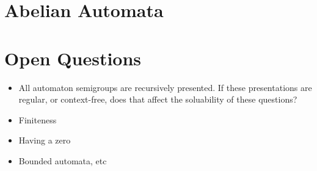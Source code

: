 \documentclass[10pt]{article} %
\newtheorem{proposition}{Proposition}
\begin{document}



    

    \section{Abelian Automata}

    \section{Open Questions} 

    \begin{itemize}
    \item All automaton semigroups are recursively presented. If these presentations are regular, or context-free, does that affect the soluability of these questions?
    \item Finiteness
    \item Having a zero
    \item Bounded automata, etc
    \end{itemize}
    
    \nocite{*}
    
    
\end{document}
